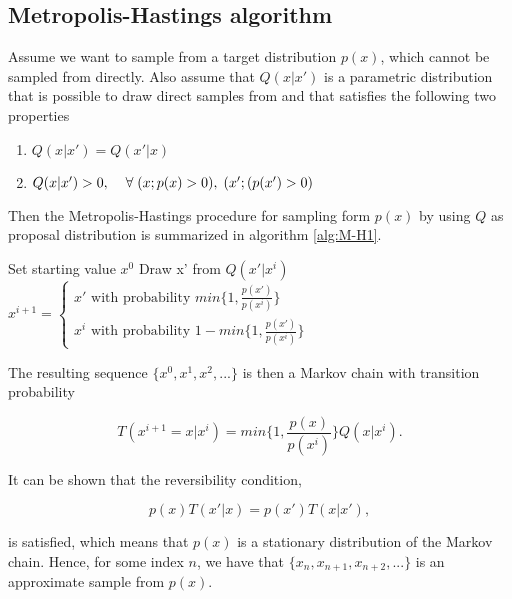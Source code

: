 \subsection{Metropolis-Hastings algorithm}
\label{Metropolis}

Assume we want to sample from a target distribution $p(x)$, which cannot be sampled from directly. Also assume that $Q(x|x')$ is a parametric distribution that is possible to draw direct samples from and that satisfies the following two properties

\begin{enumerate}
    \item $Q(x|x') = Q(x'|x)$
    \item $Q(x|x')>0,   \hspace{4mm} \forall \; (x; p(x)>0), \; (x';(p(x')>0)$
\end{enumerate}

Then the Metropolis-Hastings procedure for sampling form $p(x)$ by using $Q$ as proposal distribution is summarized in algorithm \ref{alg:M-H1}.

\begin{algorithm}
\caption{}\label{alg:M-H1}
\begin{algorithmic}
\State Set starting value $x^0$
\State Draw x' from $Q(x'|x^i)$
\State $x^{i+1} = \begin{cases} x' \text{ with probability } min\{ 1, \frac{p(x')}{p(x^i)} \}\\ x^i \text{ with probability } 1-min\{ 1, \frac{p(x')}{p(x^i)} \}
\end{cases}$
\EndFor
\end{algorithmic}
\end{algorithm}

The resulting sequence $\{  x^0, x^1, x^2,... \}$ is then a Markov chain with transition probability

\begin{equation}
    T(x^{i+1} = x|x^i) = min \Big \{ 1, \frac{p(x)}{p(x^i)} \Big \} Q(x|x^i).
\end{equation}

It can be shown that the reversibility condition, 

\begin{equation}
    p(x)T(x'|x) = p(x')T(x|x'),
\end{equation} 

is satisfied, which means that $p(x)$ is a stationary distribution of the Markov chain. Hence, for some index $n$, we have that $\{x_n, x_{n+1}, x_{n+2},...\}$ is an approximate sample from $p(x)$.

